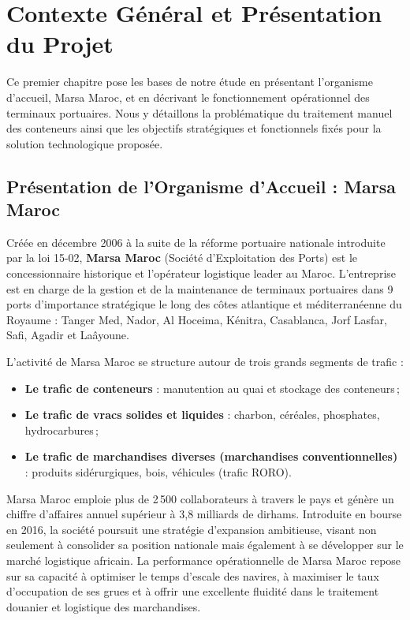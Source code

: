 \documentclass[12pt,a4paper]{article}
\begin{document}
\newpage

\section{Contexte Général et Présentation du Projet}

Ce premier chapitre pose les bases de notre étude en présentant l'organisme d'accueil, Marsa Maroc, et en décrivant le fonctionnement opérationnel des terminaux portuaires. Nous y détaillons la problématique du traitement manuel des conteneurs ainsi que les objectifs stratégiques et fonctionnels fixés pour la solution technologique proposée.

\subsection{Présentation de l'Organisme d'Accueil : Marsa Maroc}

Créée en décembre 2006 à la suite de la réforme portuaire nationale introduite par la loi 15-02, \textbf{Marsa Maroc} (Société d'Exploitation des Ports) est le concessionnaire historique et l'opérateur logistique leader au Maroc. L'entreprise est en charge de la gestion et de la maintenance de terminaux portuaires dans 9 ports d'importance stratégique le long des côtes atlantique et méditerranéenne du Royaume : Tanger Med, Nador, Al Hoceima, Kénitra, Casablanca, Jorf Lasfar, Safi, Agadir et Laâyoune.

L'activité de Marsa Maroc se structure autour de trois grands segments de trafic :
\begin{itemize}
  \item \textbf{Le trafic de conteneurs} : manutention au quai et stockage des conteneurs\,;
  \item \textbf{Le trafic de vracs solides et liquides} : charbon, céréales, phosphates, hydrocarbures\,;
  \item \textbf{Le trafic de marchandises diverses (marchandises conventionnelles)} : produits sidérurgiques, bois, véhicules (trafic RORO).
\end{itemize}

Marsa Maroc emploie plus de 2\,500 collaborateurs à travers le pays et génère un chiffre d'affaires annuel supérieur à 3,8 milliards de dirhams. Introduite en bourse en 2016, la société poursuit une stratégie d'expansion ambitieuse, visant non seulement à consolider sa position nationale mais également à se développer sur le marché logistique africain. La performance opérationnelle de Marsa Maroc repose sur sa capacité à optimiser le temps d'escale des navires, à maximiser le taux d'occupation de ses grues et à offrir une excellente fluidité dans le traitement douanier et logistique des marchandises.
\end{document}
